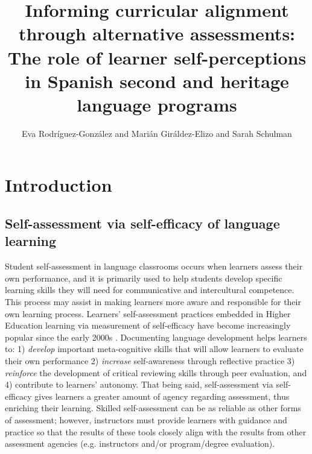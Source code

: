 \documentclass[output=paper]{langscibook}
\author{Eva Rodríguez-González\affiliation{University of New Mexico} and Marián Giráldez-Elizo\affiliation{Santa Fe Prep High School} and Sarah Schulman\affiliation{New Mexico International School}}
\title{Informing curricular alignment through alternative assessments: The role of learner self-perceptions in Spanish second and heritage language programs}
\begin{document}
\maketitle
{}
\section{{Introduction}}
\subsection{{Self-assessment via self-efficacy of language learning}}

\begin{sloppypar}
Student self-assessment in language classrooms occurs when learners assess their own performance, and it is primarily used to help students develop specific learning skills they will need for communicative and intercultural competence. This process may assist in making learners more aware and responsible for their own learning process. Learners' self-assessment practices embedded in Higher Education learning via measurement of self-efficacy have become increasingly popular since the early 2000s \citep{PapanthymouDarra2018}. Documenting language development helps learners to: 1) \emph{develop} important meta-cognitive skills that will allow learners to evaluate their own performance 2) \emph{increase} self-awareness through reflective practice 3) \emph{reinforce} the development of critical reviewing skills through peer evaluation, and 4) contribute to learners’ autonomy. That being said, self-assessment via self-efficacy gives learners a greater amount of agency regarding assessment, thus enriching their learning. Skilled self-assessment can be as reliable as other forms of assessment; however, instructors must provide learners with guidance and practice so that the results of these tools closely align with the results from other assessment agencies (e.g. instructors and/or program/degree evaluation).
\end{sloppypar}
\end{document}
